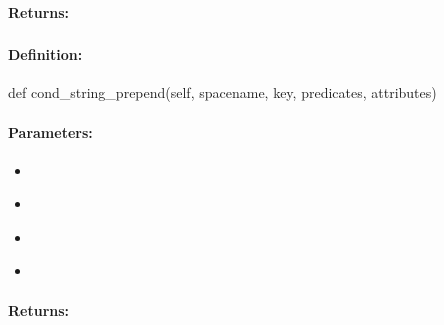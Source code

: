 \paragraph{Returns:}


\pagebreak
\subsubsection{}
\label{api:python:cond_string_prepend}


\paragraph{Definition:}
\begin{pythoncode}
def cond_string_prepend(self, spacename, key, predicates, attributes)
\end{pythoncode}

\paragraph{Parameters:}
\begin{itemize}[noitemsep]
\item {}\\

\item {}\\

\item {}\\

\item {}\\

\end{itemize}

\paragraph{Returns:}


\pagebreak
\subsubsection{}
\label{api:python:async_cond_string_prepend}


